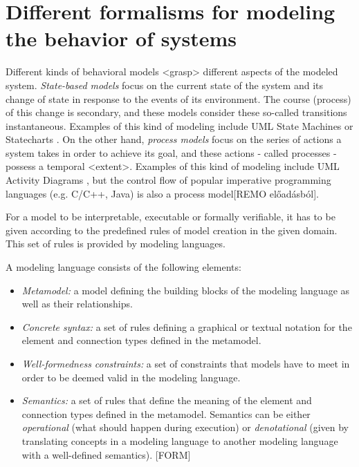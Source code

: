 \section{Different formalisms for modeling the behavior of systems} \label{modeling_section}

Different kinds of behavioral models <grasp> different aspects of the modeled system. \textit{State-based models} focus on the current state of the system and its change of state in response to the events of its environment. The course (process) of this change is secondary, and these models consider these so-called transitions instantaneous. Examples of this kind of modeling include UML State Machines \cite{UMLStandard} or Statecharts \cite{HarelStatechart87}. On the other hand, \textit{process models} focus on the series of actions a system takes in order to achieve its goal, and these actions - called processes - possess a temporal <extent>. Examples of this kind of modeling include UML Activity Diagrams \cite{UMLStandard}, but the control flow of popular imperative programming languages (e.g. C/C++, Java) is also a process model[REMO előadásból].

For a model to be interpretable, executable or formally verifiable, it has to be given according to the predefined rules of model creation in the given domain. This set of rules is provided by modeling languages.
\begin{definition}
	A modeling language consists of the following elements:
	\begin{itemize}
		\item \emph{Metamodel:} a model defining the building blocks of the modeling language as well
		as their relationships.
		\item \emph{Concrete syntax:} a set of rules defining a graphical or textual notation for the
		element and connection types defined in the metamodel.
		\item \emph{Well-formedness constraints:} a set of constraints that models have to meet in order
		to be deemed valid in the modeling language.
		\item \emph{Semantics:} a set of rules that define the meaning of the element and connection
		types defined in the metamodel. Semantics can be either \textit{operational} (what should happen during execution) or \textit{denotational} (given by translating concepts in a modeling language to another modeling language with a well-defined semantics). [FORM]
	\end{itemize}
\end{definition}

